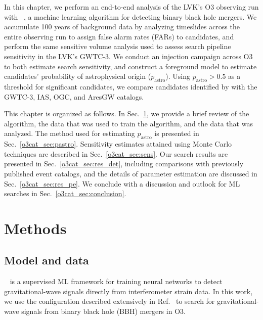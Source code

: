 \begin{refsection}
In this chapter, we perform an end-to-end analysis of the LVK's O3 observing run with \aframe~\cite{aframe-methods}, a machine learning algorithm for detecting binary black hole mergers. 
We accumulate 100 years of background data by analyzing timeslides across the entire observing run to assign false alarm rates (FARs) to candidates, and perform the same sensitive volume analysis used to assess search pipeline sensitivity in the LVK's GWTC-3. 
We conduct an injection campaign across O3 to both estimate search sensitivity, and construct a foreground model to estimate candidates' probability of astrophysical origin ($p_\mathrm{astro}$). 
Using $p_\mathrm{astro} > 0.5$ as a threshold for significant candidates, we compare candidates identified by \aframe with the GWTC-3, IAS, OGC, and AresGW catalogs. 

This chapter is organized as follows.
In Sec.~\ref{o3cat_sec:methods}, we provide a brief review of the \aframe algorithm, the data that was used to train the algorithm, and the data that was analyzed. The method used for estimating $p_{\mathrm{astro}}$ is presented in Sec.~\ref{o3cat_sec:pastro}.
Sensitivity estimates attained using Monte Carlo techniques are described in Sec.~\ref{o3cat_sec:sens}.
Our search results are presented in Sec.~\ref{o3cat_sec:res_det}, including comparisons with previously published event catalogs, and the details of parameter estimation are discussed in Sec.~\ref{o3cat_sec:res_pe}.
We conclude with a discussion and outlook for ML searches in Sec.~\ref{o3cat_sec:conclusion}.

\section{Methods}
\label{o3cat_sec:methods}

\subsection{Model and data}
\label{o3cat_sec:model}

\aframe~\cite{Marx_aframe} is a supervised ML framework for training neural networks to detect gravitational-wave signals directly from interferometer strain data. 
In this work, we use the \aframe configuration described extensively in Ref.~\cite{aframe-methods} to search for gravitational-wave signals from binary black hole (BBH) mergers in O3. 


\end{refsection}
